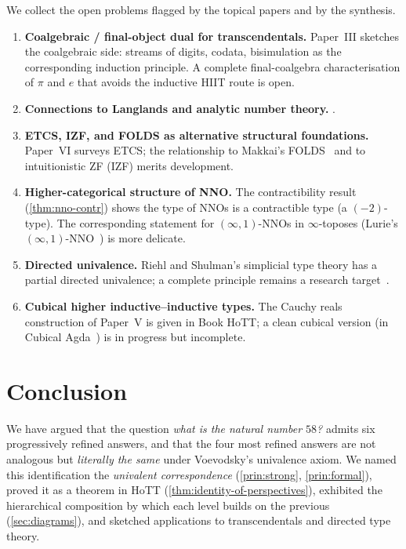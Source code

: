 \documentclass[12pt]{article}
\theoremstyle{definition}
\theoremstyle{remark}
\begin{document}
We collect the open problems flagged by the topical papers and by the
synthesis.

\begin{enumerate}
\item \textbf{Coalgebraic / final-object dual for transcendentals.}
Paper~III sketches the coalgebraic side: streams of digits, codata,
bisimulation as the corresponding induction principle. A complete
final-coalgebra characterisation of $\pi$ and $e$ that avoids the
inductive HIIT route is open.
\item \textbf{Connections to Langlands and analytic number theory.}
.
\item \textbf{ETCS, IZF, and FOLDS as alternative structural foundations.}
Paper~VI surveys ETCS; the relationship to Makkai's
FOLDS~\cite{Makkai1995} and to intuitionistic ZF (IZF) merits
development.
\item \textbf{Higher-categorical structure of NNO.} The contractibility
result (\cref{thm:nno-contr}) shows the type of NNOs is a contractible
type (a $(-2)$-type). The corresponding statement for $(\infty,1)$-NNOs in
$\infty$-toposes (Lurie's $(\infty,1)$-NNO~\cite{lurie}) is more delicate.
\item \textbf{Directed univalence.} Riehl and Shulman's simplicial type
theory has a partial directed univalence; a complete principle remains a
research target~\cite{RiehlShulman,CisinskiNguyen}.
\item \textbf{Cubical higher inductive--inductive types.} The Cauchy
reals construction of Paper~V is given in Book HoTT; a clean cubical
version (in Cubical Agda~\cite{CubicalAgda}) is in progress but
incomplete.
\end{enumerate}

\section{Conclusion}
\label{sec:conclusion}

We have argued that the question \emph{what is the natural number $58$?}
admits six progressively refined answers, and that the four most refined
answers are not analogous but \emph{literally the same} under Voevodsky's
univalence axiom. We named this identification the \emph{univalent
correspondence} (\cref{prin:strong}, \cref{prin:formal}), proved it as a
theorem in HoTT (\cref{thm:identity-of-perspectives}), exhibited the
hierarchical composition by which each level builds on the previous
(\cref{sec:diagrams}), and sketched applications to transcendentals
and directed type theory.
\end{document}
